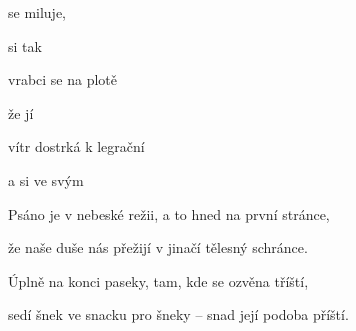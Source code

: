 

\zr
{} se miluje,  

 si  tak 

vrabci se na plotě 

 že  jí 
\kr

\zs
{} vítr dostrká k   legrační 

a  si ve svým    
\ks

\zr  \kr

\zs
Psáno je v nebeské režii, a to hned na první stránce,

že naše duše nás přežijí v jinačí tělesný schránce.
\ks

\zr  \kr

\zs
Úplně na konci paseky, tam, kde se ozvěna tříští,

sedí šnek ve snacku pro šneky -- snad její podoba příští.     \ks

\zr  \kr

\kp





